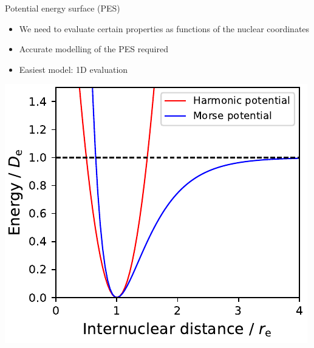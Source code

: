 \documentclass[t]{beamer}
\begin{document}
\begin{frame}{Potential energy surface (PES)}
	\begin{minipage}[b]{0.35\textwidth}
		\begin{itemize}
			\item We need to evaluate certain properties as functions of the nuclear coordinates
			\item Accurate modelling of the PES required
			\item Easiest model: 1D evaluation
		\end{itemize}
		\vspace{2.2cm}
	\end{minipage}
	\begin{minipage}[t]{0.6\textwidth}
		\includegraphics[width=\textwidth]{figures/potential.pdf}
	\end{minipage}
\end{frame}
\end{document}
